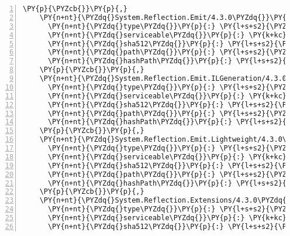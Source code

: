 \begin{Verbatim}[commandchars=\\\{\},numbers=left,firstnumber=1,stepnumber=1,numberblanklines=0]
    \PY{p}{\PYZcb{}}\PY{p}{,}
    \PY{n+nt}{\PYZdq{}System.Reflection.Emit/4.3.0\PYZdq{}}\PY{p}{:} \PY{p}{\PYZob{}}
      \PY{n+nt}{\PYZdq{}type\PYZdq{}}\PY{p}{:} \PY{l+s+s2}{\PYZdq{}package\PYZdq{}}\PY{p}{,}
      \PY{n+nt}{\PYZdq{}serviceable\PYZdq{}}\PY{p}{:} \PY{k+kc}{true}\PY{p}{,}
      \PY{n+nt}{\PYZdq{}sha512\PYZdq{}}\PY{p}{:} \PY{l+s+s2}{\PYZdq{}sha512\PYZhy{}228FG0jLcIwTVJyz8CLFKueVqQK36ANazUManGaJHkO0icjiIypKW7YLWLIWahyIkdh5M7mV2dJepllLyA1SKg==\PYZdq{}}\PY{p}{,}
      \PY{n+nt}{\PYZdq{}path\PYZdq{}}\PY{p}{:} \PY{l+s+s2}{\PYZdq{}system.reflection.emit/4.3.0\PYZdq{}}\PY{p}{,}
      \PY{n+nt}{\PYZdq{}hashPath\PYZdq{}}\PY{p}{:} \PY{l+s+s2}{\PYZdq{}system.reflection.emit.4.3.0.nupkg.sha512\PYZdq{}}
    \PY{p}{\PYZcb{}}\PY{p}{,}
    \PY{n+nt}{\PYZdq{}System.Reflection.Emit.ILGeneration/4.3.0\PYZdq{}}\PY{p}{:} \PY{p}{\PYZob{}}
      \PY{n+nt}{\PYZdq{}type\PYZdq{}}\PY{p}{:} \PY{l+s+s2}{\PYZdq{}package\PYZdq{}}\PY{p}{,}
      \PY{n+nt}{\PYZdq{}serviceable\PYZdq{}}\PY{p}{:} \PY{k+kc}{true}\PY{p}{,}
      \PY{n+nt}{\PYZdq{}sha512\PYZdq{}}\PY{p}{:} \PY{l+s+s2}{\PYZdq{}sha512\PYZhy{}59tBslAk9733NXLrUJrwNZEzbMAcu8k344OYo+wfSVygcgZ9lgBdGIzH/nrg3LYhXceynyvTc8t5/GD4Ri0/ng==\PYZdq{}}\PY{p}{,}
      \PY{n+nt}{\PYZdq{}path\PYZdq{}}\PY{p}{:} \PY{l+s+s2}{\PYZdq{}system.reflection.emit.ilgeneration/4.3.0\PYZdq{}}\PY{p}{,}
      \PY{n+nt}{\PYZdq{}hashPath\PYZdq{}}\PY{p}{:} \PY{l+s+s2}{\PYZdq{}system.reflection.emit.ilgeneration.4.3.0.nupkg.sha512\PYZdq{}}
    \PY{p}{\PYZcb{}}\PY{p}{,}
    \PY{n+nt}{\PYZdq{}System.Reflection.Emit.Lightweight/4.3.0\PYZdq{}}\PY{p}{:} \PY{p}{\PYZob{}}
      \PY{n+nt}{\PYZdq{}type\PYZdq{}}\PY{p}{:} \PY{l+s+s2}{\PYZdq{}package\PYZdq{}}\PY{p}{,}
      \PY{n+nt}{\PYZdq{}serviceable\PYZdq{}}\PY{p}{:} \PY{k+kc}{true}\PY{p}{,}
      \PY{n+nt}{\PYZdq{}sha512\PYZdq{}}\PY{p}{:} \PY{l+s+s2}{\PYZdq{}sha512\PYZhy{}oadVHGSMsTmZsAF864QYN1t1QzZjIcuKU3l2S9cZOwDdDueNTrqq1yRj7koFfIGEnKpt6NjpL3rOzRhs4ryOgA==\PYZdq{}}\PY{p}{,}
      \PY{n+nt}{\PYZdq{}path\PYZdq{}}\PY{p}{:} \PY{l+s+s2}{\PYZdq{}system.reflection.emit.lightweight/4.3.0\PYZdq{}}\PY{p}{,}
      \PY{n+nt}{\PYZdq{}hashPath\PYZdq{}}\PY{p}{:} \PY{l+s+s2}{\PYZdq{}system.reflection.emit.lightweight.4.3.0.nupkg.sha512\PYZdq{}}
    \PY{p}{\PYZcb{}}\PY{p}{,}
    \PY{n+nt}{\PYZdq{}System.Reflection.Extensions/4.3.0\PYZdq{}}\PY{p}{:} \PY{p}{\PYZob{}}
      \PY{n+nt}{\PYZdq{}type\PYZdq{}}\PY{p}{:} \PY{l+s+s2}{\PYZdq{}package\PYZdq{}}\PY{p}{,}
      \PY{n+nt}{\PYZdq{}serviceable\PYZdq{}}\PY{p}{:} \PY{k+kc}{true}\PY{p}{,}
      \PY{n+nt}{\PYZdq{}sha512\PYZdq{}}\PY{p}{:} \PY{l+s+s2}{\PYZdq{}sha512\PYZhy{}rJkrJD3kBI5B712aRu4DpSIiHRtr6QlfZSQsb0hYHrDCZORXCFjQfoipo2LaMUHoT9i1B7j7MnfaEKWDFmFQNQ==\PYZdq{}}\PY{p}{,}

\end{Verbatim}
